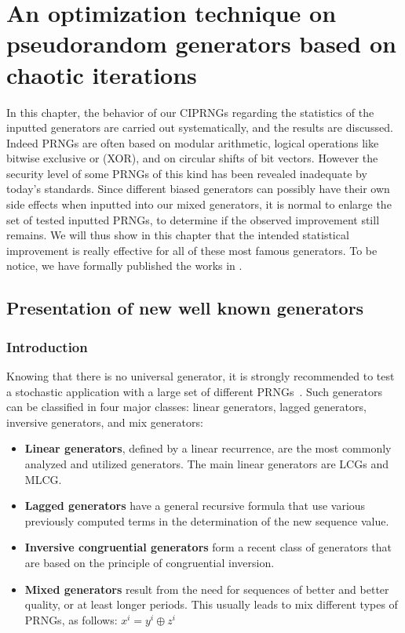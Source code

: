 \chapter{An optimization technique on pseudorandom generators based on chaotic iterations}
\minitoc
\label{An optimization technique on pseudorandom generators based on chaotic iterations}

In this chapter, the behavior of our CIPRNGs regarding 
the statistics of the inputted generators are carried out systematically, and the results are discussed.
Indeed PRNGs are often based on modular arithmetic, logical operations like bitwise exclusive or (XOR), and on circular shifts of
bit vectors.
However the security level of some PRNGs of this kind has been revealed inadequate by today's standards.
Since different biased generators can possibly have their own side effects when inputted into our mixed generators, it is normal to enlarge the set of tested inputted PRNGs, to determine if the observed improvement still remains.
We will thus show in this chapter that the intended statistical improvement is really effective for all of these most famous generators. To be notice, we have formally published the works in \cite{bfg12a:ip}.



\section{Presentation of new well known generators}
\label{The generation of pseudo-random sequence}

\subsection{Introduction}

Knowing that there is no universal generator, it is strongly recommended to test a stochastic application with a large set of different PRNGs~\cite{DavidRC2003643}. Such 
generators can be classified in four major classes: linear generators, lagged generators, inversive generators, and mix generators:
\begin{itemize}
 \item \textbf{Linear generators}, defined by a linear recurrence, are the most commonly analyzed and utilized generators. The main linear generators are LCGs and MLCG.
 \item \textbf{Lagged generators} have a general recursive formula that use various previously computed terms in the determination of the new sequence value.
 \item \textbf{Inversive congruential generators} form a recent class of generators that are based on the principle of congruential inversion.
 \item \textbf{Mixed generators} result from the need for sequences of better and better quality, or at least longer periods. This usually leads to mix different types of PRNGs, as follows: $x^i=y^i\oplus z^i$
\end{itemize}


